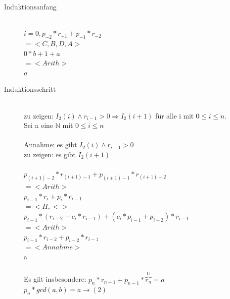\documentclass[a4paper,10pt]{article}
\newcommand{\NN}{\mathbb{N}} %
\newcommand{\ra}{\rightarrow}
\newcommand{\Ra}{\Rightarrow}
\begin{document}
\begin{description}
	\item[Induktionsanfang] \hfill \\
		$i=0, p_{-2} * r_{-1} + p_{-1} * r_{-2}$ \\
		$= <C, B, D, A>$ \\
		$0 * b + 1 + a$ \\
		$=<Arith>$ \\
		$a$
	\item[Induktionsschritt] \hfill \\
		zu zeigen: $I_2(i) \wedge r_{i-1} > 0 \Ra I_2(i+1)$ f\"ur alle i mit $0 \leq i \leq n$. \\
		Sei n eine $\NN$ mit $0 \leq i \leq n$ \\
		\\
		Annahme: es gibt $I_2(i) \wedge r_{i-1} > 0$ \\
		zu zeigen: es gibt $I_2(i+1)$ \\
		\\
		$p_{(i+1)-2} * r_{(i+1)-1} + p_{(i+1)-1} * r_{(i+1)-2}$ \\
		$= <Arith>$ \\
		$p_{i-1} * r_i + p_i * r_{i-1}$ \\
		$= <H, < >$ \\
		$p_{i-1} * (r_{i-2} - c_i * r_{i-1}) +(c_i * p_{i-1} + p_{i-2}) *r_{i-1}$ \\
		$= <Arith>$ \\
		$p_{i-1} * r_{i-2} + p_{i-2} * r_{i-1}$ \\
		$= <Annahme>$ \\
		a \\
		\\
		Es gilt insbesondere: $p_n * r_{n-1} + p_{n-1} * \overbrace{r_n}^{0}=a$  \\
		$p_n * gcd(a,b)=a \ra (2)$
\end{description}
\end{document}
